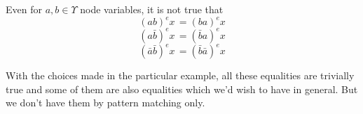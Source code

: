 Even for $a, b \in \Upsilon$ node variables, it is not true that 
\begin{equation}
(a b)^{e} x \, = (b a)^{e} x
\label{abba}
\end{equation}
\begin{equation}
(a \bar{b})^{e} x \, = (\bar{b}a)^{e} x
\label{abbara}
\end{equation}
\begin{equation}
(\bar{a} \bar{b})^{e} x \, = (\bar{b} \bar{a})^{e} x
\label{barabbara}
\end{equation}

With the choices made in the particular example, all  these equalities are trivially true and some of them are also equalities which we'd wish to have in general. But we don't have them by pattern matching only.

